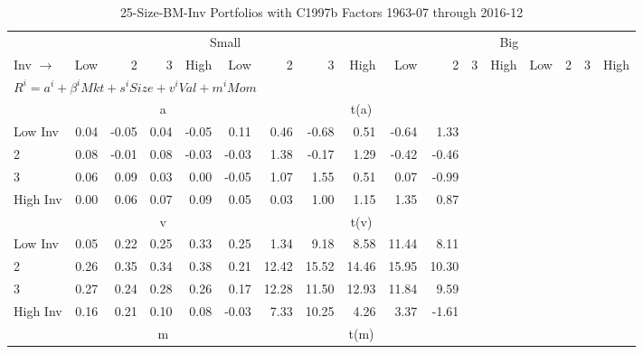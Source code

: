
\begin{table}[!ht]
\centering
\caption{25-Size-BM-Inv Portfolios with C1997b Factors 1963-07 through 2016-12}
\begin{tabular}{lrrrrrrrrrrrrrrrr}
  \toprule
    & \multicolumn{8}{c}{Small} & \multicolumn{8}{c}{Big} \\
      \cmidrule(r){2-9} \cmidrule(r){10-17}
    Inv $\rightarrow$ & Low & 2 & 3 & High & Low & 2 & 3 & High & Low & 2 & 3 & High & Low & 2 & 3 & High \\ 
  \midrule
  \multicolumn{11}{l}{$R^i=a^i+\beta^iMkt+s^iSize+v^iVal+m^iMom$} \\

  
    
      & \multicolumn{5}{c}{a} & \multicolumn{5}{c}{t(a)}
    
    \\
      \cmidrule(r){2-5} \cmidrule(r){6-9} \cmidrule(r){10-13} \cmidrule(r){14-17}

    Low Inv   & 0.04  & -0.05  & 0.04  & -0.05  & 0.11  & 0.46  & -0.68  & 0.51  & -0.64  & 1.33  \\
           2  & 0.08  & -0.01  & 0.08  & -0.03  & -0.03  & 1.38  & -0.17  & 1.29  & -0.42  & -0.46  \\
           3  & 0.06  & 0.09  & 0.03  & 0.00  & -0.05  & 1.07  & 1.55  & 0.51  & 0.07  & -0.99  \\
    High Inv  & 0.00  & 0.06  & 0.07  & 0.09  & 0.05  & 0.03  & 1.00  & 1.15  & 1.35  & 0.87  \\

  
    
      & \multicolumn{5}{c}{v} & \multicolumn{5}{c}{t(v)}
    
    \\
      \cmidrule(r){2-5} \cmidrule(r){6-9} \cmidrule(r){10-13} \cmidrule(r){14-17}

    Low Inv   & 0.05  & 0.22  & 0.25  & 0.33  & 0.25  & 1.34  & 9.18  & 8.58  & 11.44  & 8.11  \\
           2  & 0.26  & 0.35  & 0.34  & 0.38  & 0.21  & 12.42  & 15.52  & 14.46  & 15.95  & 10.30  \\
           3  & 0.27  & 0.24  & 0.28  & 0.26  & 0.17  & 12.28  & 11.50  & 12.93  & 11.84  & 9.59  \\
    High Inv  & 0.16  & 0.21  & 0.10  & 0.08  & -0.03  & 7.33  & 10.25  & 4.26  & 3.37  & -1.61  \\

  
    
      & \multicolumn{5}{c}{m} & \multicolumn{5}{c}{t(m)}
    

\end{tabular}
\end{table}

